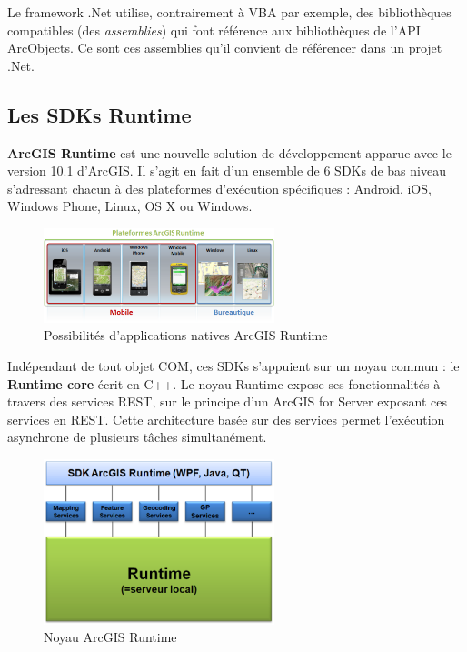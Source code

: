 \documentclass[11pt]{article}
\begin{document}
Le framework .Net utilise, contrairement à VBA par exemple, des bibliothèques compatibles (des \textit{assemblies}) qui font référence aux bibliothèques de l'API ArcObjects. Ce sont ces assemblies qu'il convient de référencer dans un projet .Net.


\subsection{Les SDKs Runtime}
\textbf{ArcGIS Runtime} est une nouvelle solution de développement apparue avec le version 10.1 d'ArcGIS. Il s'agit en fait d'un ensemble de 6 SDKs de bas niveau s'adressant chacun à des plateformes d'exécution spécifiques : Android, iOS, Windows Phone, Linux, OS X ou Windows.

\begin{figure}[H]
	\center \includegraphics[width=0.6\textwidth]{img/cours/arcgis_runtime-1.png}
	\caption{Possibilités d'applications natives ArcGIS Runtime}
\end{figure}

Indépendant de tout objet COM, ces SDKs s'appuient sur un noyau commun : le \textbf{Runtime core} écrit en C++. Le noyau Runtime expose ses fonctionnalités à travers des services REST, sur le principe d'un ArcGIS for Server exposant ces services en REST. Cette architecture basée sur des services permet l'exécution asynchrone de plusieurs tâches simultanément. 

\begin{figure}[H]
	\center \includegraphics[width=0.6\textwidth]{img/cours/arcgis_runtime-2.png}
	\caption{Noyau ArcGIS Runtime}
\end{figure}
\end{document}
